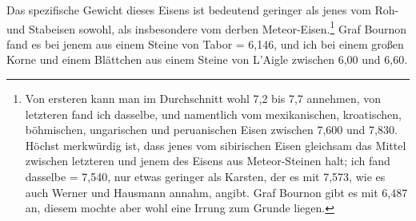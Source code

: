 \documentclass[a4paper, 11pt, oneside, german]{article}
\begin{document}
Das spezifische Gewicht dieses Eisens ist bedeutend geringer als jenes vom Roh- und Stabeisen sowohl, als insbesondere vom derben Meteor-Eisen.\footnote{Von ersteren kann man im Durchschnitt wohl 7,2 bis 7,7 annehmen, von letzteren fand ich dasselbe, und namentlich vom mexikanischen, kroatischen, böhmischen, ungarischen und peruanischen Eisen zwischen 7,600 und 7,830. Höchst merkwürdig ist, dass jenes vom sibirischen Eisen gleichsam das Mittel zwischen letzteren und jenem des Eisens aus Meteor-Steinen halt; ich fand dasselbe = 7,540, nur etwas geringer als Karsten, der es mit 7,573, wie es auch Werner und Hausmann annahm, angibt. Graf Bournon gibt es mit 6,487 an, diesem mochte aber wohl eine Irrung zum Grunde liegen.} Graf Bournon fand es bei jenem aus einem Steine von Tabor = 6,146, und ich bei einem großen Korne und einem Blättchen aus einem Steine von L'Aigle zwischen 6,00 und 6,60.
\end{document}
